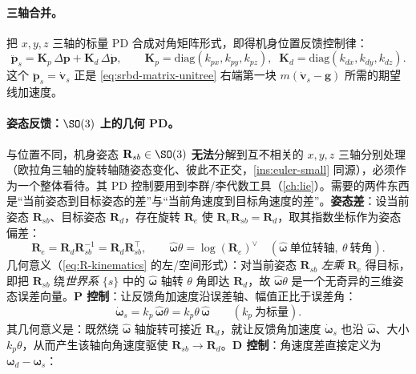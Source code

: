 \paragraph{三轴合并。}
把 $x,y,z$ 三轴的标量 PD 合成对角矩阵形式，即得机身位置反馈控制律\cite{unitree2023quadruped}：
\begin{equation}
  \ddot{\boldsymbol{p}}_s=\mathbf{K}_p\,\Delta\boldsymbol{p}+\mathbf{K}_d\,\Delta\dot{\boldsymbol{p}},
  \qquad
  \mathbf{K}_p=\mathrm{diag}(k_{px},k_{py},k_{pz}),\;\;
  \mathbf{K}_d=\mathrm{diag}(k_{dx},k_{dy},k_{dz}).
  \label{eq:bal-pos-3axis}
\end{equation}
这个 $\ddot{\boldsymbol{p}}_s=\dot{\boldsymbol{v}}_s$ 正是 \cref{eq:srbd-matrix-unitree} 右端第一块 $m(\dot{\boldsymbol{v}}_s-\boldsymbol{g})$ 所需的期望线加速度。

\paragraph{ 姿态反馈：$\SO(3)$ 上的几何 PD。}
与位置不同，机身姿态 $\mathbf{R}_{sb}\in\SO(3)$ \textbf{无法}分解到互不相关的 $x,y,z$ 三轴分别处理（欧拉角三轴的旋转轴随姿态变化、彼此不正交，\cref{ins:euler-small} 同源），必须作为一个整体看待。其 PD 控制要用到李群/李代数工具（\cref{ch:lie}）。需要的两件东西是“当前姿态到目标姿态的差”与“当前角速度到目标角速度的差”。\textbf{姿态差}：设当前姿态 $\mathbf{R}_{sb}$、目标姿态 $\mathbf{R}_d$，存在旋转 $\mathbf{R}_e$ 使 $\mathbf{R}_e\mathbf{R}_{sb}=\mathbf{R}_d$，取其指数坐标作为姿态偏差\cite{unitree2023quadruped}：
\begin{equation}
  \mathbf{R}_e=\mathbf{R}_d\mathbf{R}_{sb}^{-1}=\mathbf{R}_d\mathbf{R}_{sb}^{\top},
  \qquad
  \hat{\boldsymbol{\omega}}\theta=\log(\mathbf{R}_e)^{\vee}
  \quad(\hat{\boldsymbol{\omega}}\ \text{单位转轴},\ \theta\ \text{转角}).
  \label{eq:bal-att-error}
\end{equation}
几何意义（\cref{eq:R-kinematics} 的左/空间形式）：对当前姿态 $\mathbf{R}_{sb}$ \emph{左乘} $\mathbf{R}_e$ 得目标，即把 $\mathbf{R}_{sb}$ 绕\emph{世界系} $\{s\}$ 中的 $\hat{\boldsymbol{\omega}}$ 轴转 $\theta$ 角即达 $\mathbf{R}_d$，故 $\hat{\boldsymbol{\omega}}\theta$ 是一个无奇异的三维姿态误差向量。\textbf{P 控制}：让反馈角加速度沿误差轴、幅值正比于误差角\cite{unitree2023quadruped}：
\begin{equation}
  \dot{\boldsymbol{\omega}}_s=k_p\,\hat{\boldsymbol{\omega}}\theta=k_p\theta\,\hat{\boldsymbol{\omega}}
  \qquad(k_p\ \text{为标量}).
  \label{eq:bal-att-p}
\end{equation}
其几何意义是：既然绕 $\hat{\boldsymbol{\omega}}$ 轴旋转可接近 $\mathbf{R}_d$，就让反馈角加速度 $\dot{\boldsymbol{\omega}}_s$ 也沿 $\hat{\boldsymbol{\omega}}$、大小 $k_p\theta$，从而产生该轴向角速度驱使 $\mathbf{R}_{sb}\to\mathbf{R}_d$。\textbf{D 控制}：角速度差直接定义为 $\boldsymbol{\omega}_d-\boldsymbol{\omega}_s$\cite{unitree2023quadruped}：
